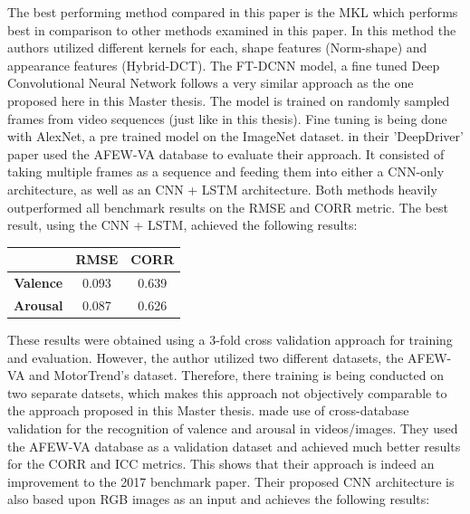 The best performing method compared in this paper is the MKL which performs best in comparison to other methods examined in this paper. In this method the authors utilized different kernels for each, shape features (Norm-shape) and appearance features (Hybrid-DCT).
\newline\newline
The FT-DCNN model, a fine tuned Deep Convolutional Neural Network follows a very similar approach as the one proposed here in this Master thesis. The model is trained on randomly sampled frames from video sequences (just like in this thesis). Fine tuning is being done with AlexNet, a pre trained model on the ImageNet dataset.
\newline\newline
\citet{Theagarajan:2018:DeepDriver} in their 'DeepDriver' paper used the AFEW-VA database to evaluate their approach. It consisted of taking multiple frames as a sequence and feeding them into either a CNN-only architecture, as well as an CNN + LSTM architecture. Both methods heavily outperformed all benchmark results on the RMSE and CORR metric. The best result, using the CNN + LSTM, achieved the following results:


\begin{table}[H]
\centering
\begin{tabular}{c|cc}
\multicolumn{1}{l|}{\textbf{}} & \multicolumn{1}{l}{\cellcolor[HTML]{CBCEFB}\textbf{RMSE}} & \multicolumn{1}{l}{\cellcolor[HTML]{CBCEFB}\textbf{CORR}} \\ \hline
\cellcolor[HTML]{F8FF00}\textbf{Valence} & 0.093 & 0.639 \\ \hline
\cellcolor[HTML]{F8FF00}\textbf{Arousal} & 0.087 & 0.626 \\ 
\end{tabular}
\end{table}

These results were obtained using a 3-fold cross validation approach for training and evaluation. However, the author utilized two different datasets, the AFEW-VA and MotorTrend's dataset. Therefore, there training is being conducted on two separate datsets, which makes this approach not objectively comparable to the approach proposed in this Master thesis. 
\newline\newline
\citet{Handrich:2020:SimultaneousPredVA} made use of cross-database validation for the recognition of valence and arousal in videos/images. They used the AFEW-VA database \citep{Kossaifi:2017:AFEW-VADatabase} as a validation dataset and achieved much better results for the CORR and ICC metrics. This shows that their approach is indeed an improvement to the 2017 benchmark paper. Their proposed CNN architecture is also based upon RGB images as an input and achieves the following results:

